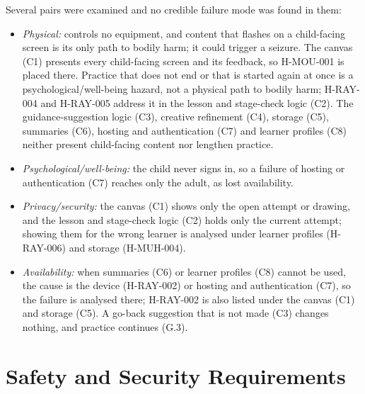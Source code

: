 \documentclass{article}
\begin{document}
Several pairs were examined and no credible failure mode was found in them:
\begin{itemize}
  \item \emph{Physical:} \progname{} controls no equipment, and content that
  flashes on a child-facing screen is its only path to bodily harm; it could
  trigger a seizure. The canvas (C1) presents every child-facing screen and its
  feedback, so \mbox{H-MOU-001} is placed there. Practice that does not end or
  that is started again at once is a psychological/well-being hazard, not a physical
  path to bodily harm; H-RAY-004 and H-RAY-005 address it in the lesson and
  stage-check logic (C2). The guidance-suggestion logic (C3), creative refinement
  (C4), storage (C5), summaries (C6), hosting and authentication (C7) and
  learner profiles (C8) neither present child-facing content nor lengthen
  practice.
  \item \emph{Psychological/well-being:} the child never signs in, so a failure
  of hosting or authentication (C7) reaches only the adult, as lost
  availability.
  \item \emph{Privacy/security:} the canvas (C1) shows only the open attempt or
  drawing, and the lesson and stage-check logic (C2) holds only the current
  attempt; showing them for the wrong learner is analysed under learner profiles
  (H-RAY-006) and storage (H-MUH-004).
  \item \emph{Availability:} when summaries (C6) or learner profiles (C8) cannot
  be used, the cause is the device (H-RAY-002) or hosting and authentication
  (C7), so the failure is analysed there; H-RAY-002 is also listed under the
  canvas (C1) and storage (C5). A go-back suggestion that is not made (C3)
  changes nothing, and practice continues (G.3).
\end{itemize}

\section{Safety and Security Requirements}\label{sec:safety-reqs}
\end{document}
